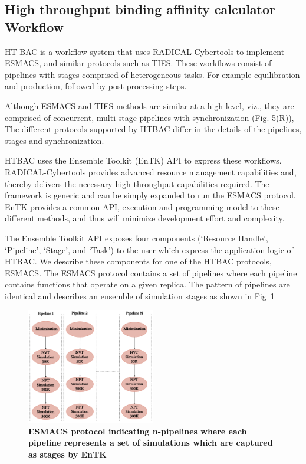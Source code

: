 \subsection{High throughput binding affinity calculator Workflow}


HT-BAC is a workflow system that uses RADICAL-Cybertools to implement ESMACS,
and similar protocols such as TIES. These workflows consist of pipelines with
stages comprised of heterogeneous tasks. For example equilibration and
production, followed by post processing steps. 

Although ESMACS and TIES methods are similar at a high-level, viz., they are
comprised of concurrent, multi-stage pipelines with synchronization (Fig.
5(R)), The different protocols supported by HTBAC differ in the details of the
pipelines, stages and synchronization.

HTBAC uses the Ensemble Toolkit (EnTK) API to express these workflows. RADICAL-Cybertools
provides advanced resource management capabilities and, thereby delivers the
necessary high-throughput capabilities required. The framework is generic and
can be simply expanded to run the ESMACS protocol. EnTK provides a common API,
execution and programming model to these different methods, and thus will
minimize development effort and complexity.

The Ensemble Toolkit API exposes four components (‘Resource
Handle’, ‘Pipeline’, ‘Stage’, and ‘Task') to the user which express the
application logic of HTBAC. We describe these components for one of the HTBAC
protocols, ESMACS. The ESMACS protocol contains a set of pipelines where each
pipeline contains functions that operate on a given replica. The pattern of
pipelines are identical and describes an ensemble of simulation stages as shown in Fig~\ref{figure:ESMACS-pipelines}

\begin{figure}[ht]
\centering
  \includegraphics[width=0.5\textwidth]{FIGURES/HT-BAC-NAMD-pipelines-control-flow-only.pdf}
  \caption{\bf ESMACS protocol indicating n-pipelines where each pipeline represents a set of simulations which are captured as stages by EnTK}
   \label{figure:ESMACS-pipelines}
\end{figure}

